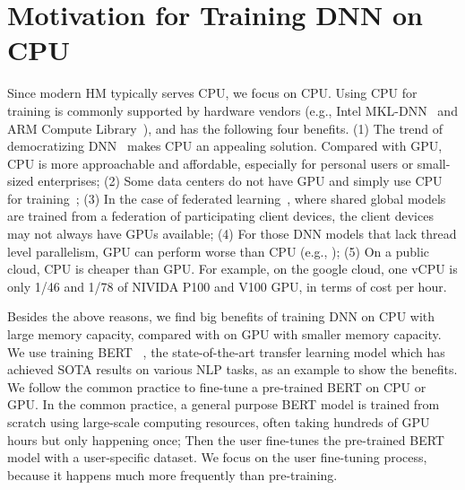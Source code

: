 \section{Motivation for Training DNN on CPU}
\label{sec:motivation}

\textcolor{check}{Since modern HM typically serves CPU, we focus on CPU. Using CPU for training is commonly supported by hardware vendors (e.g., Intel MKL-DNN~\cite{intelMKL} and ARM Compute Library~\cite{arm_cl}), and has the following four benefits. (1) The trend of democratizing DNN~\cite{democratization_ai} makes CPU an appealing solution. Compared with GPU, CPU is more approachable and affordable, especially for personal users or small-sized enterprises; (2) Some data centers do not have GPU and simply use CPU for training~\cite{lbnl_cori, tacc_stampede, 8658402, Kurth:2018:EDL:3291656.3291724, Mathuriya:2018:CUD:3291656.3291743,  tacc_ml_CPU_training}; \textcolor{dong}{(3) In the case of federated learning~\cite{konen2016federated}, where shared global models are trained from a federation of participating client devices, the client devices may not always have GPUs available}; (4) For those DNN models that lack thread level parallelism, GPU can perform worse than CPU (e.g., \cite{DBLP:journals/corr/ChengKHSCAACCIA16, Hasselt:2016:DRL:3016100.3016191,mlsys19:chen});
(5) On a public cloud, CPU is cheaper than GPU. For example, on the google cloud, one vCPU is only 1/46 and 1/78 of NIVIDA P100 and V100 GPU, in terms of cost per hour.} %



\textcolor{check}{Besides the above reasons, we find big benefits of training DNN on CPU with large memory capacity, compared with on GPU with smaller memory capacity. We use training BERT~\cite{devlin2018bert}
\textcolor{dong2}{, the state-of-the-art transfer learning model which has achieved SOTA results on various NLP tasks,} as an example to show the benefits. We follow the common practice to %
\textcolor{jie}{fine-tune} a pre-trained BERT on CPU or GPU. In the common practice, a general purpose BERT model is trained from scratch using large-scale computing resources\textcolor{dong}{, often taking hundreds of GPU hours but only happening once}; Then the user %
\textcolor{jie}{fine-tunes} the pre-trained BERT model with a user-specific dataset. We focus on the user \textcolor{jie}{fine-tuning} %
process, because it happens much more frequently than pre-training.}

